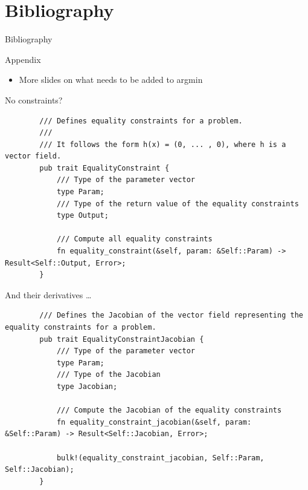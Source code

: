\documentclass{beamer}
\begin{document}
\section*{Bibliography}

\begin{frame}[allowframebreaks]{Bibliography}
  \nocite{*}
  \printbibliography
\end{frame}

\begin{frame}
  \centering
  {\Huge Appendix}

  \vfill
  \raggedright
  \begin{itemize}
    \item More slides on what needs to be added to argmin
  \end{itemize}
\end{frame}

\begin{frame}[fragile]{No constraints?}

  \begin{listing}
    \begin{verbatim}
        /// Defines equality constraints for a problem.
        ///
        /// It follows the form h(x) = (0, ... , 0), where h is a vector field.
        pub trait EqualityConstraint {
            /// Type of the parameter vector
            type Param;
            /// Type of the return value of the equality constraints
            type Output;

            /// Compute all equality constraints
            fn equality_constraint(&self, param: &Self::Param) -> Result<Self::Output, Error>;
        }
    \end{verbatim}
  \end{listing}

  \tiny
  And their derivatives \dots

  \begin{listing}
    \begin{verbatim}
        /// Defines the Jacobian of the vector field representing the equality constraints for a problem.
        pub trait EqualityConstraintJacobian {
            /// Type of the parameter vector
            type Param;
            /// Type of the Jacobian
            type Jacobian;

            /// Compute the Jacobian of the equality constraints
            fn equality_constraint_jacobian(&self, param: &Self::Param) -> Result<Self::Jacobian, Error>;

            bulk!(equality_constraint_jacobian, Self::Param, Self::Jacobian);
        }
    \end{verbatim}
  \end{listing}

\end{frame}
\end{document}
